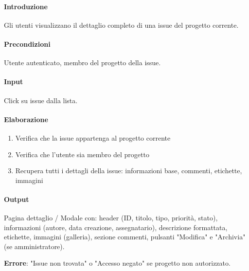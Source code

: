 \vspace{0.5cm}

\newpage


\begin{reqbox}[title=REQ-FUN-11: Visualizza Dettagli Issue]
\label{subsubsec:req-visualizza-dettagli-issue}

\paragraph{Introduzione}
Gli utenti visualizzano il dettaglio completo di una issue del progetto corrente.

\paragraph{Precondizioni}
Utente autenticato, membro del progetto della issue.

\paragraph{Input}
Click su issue dalla lista.

\paragraph{Elaborazione}
\begin{enumerate}[leftmargin=1.1em]
\item Verifica che la issue appartenga al progetto corrente
\item Verifica che l'utente sia membro del progetto
\item Recupera tutti i dettagli della issue: informazioni base, commenti, etichette, immagini
\end{enumerate}

\paragraph{Output}
Pagina dettaglio / Modale con: header (ID, titolo, tipo, priorità, stato), informazioni (autore, data creazione, assegnatario), descrizione formattata, etichette, immagini (galleria), sezione commenti, pulsanti "Modifica" e "Archivia" (se amministratore).

\textbf{Errore}: "Issue non trovata" o "Accesso negato" se progetto non autorizzato.

\end{reqbox}

